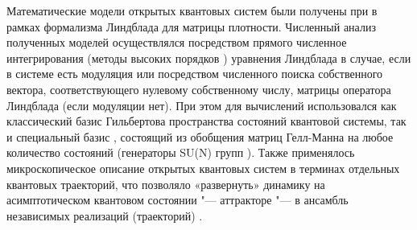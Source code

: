 {\methods} 
Математические модели открытых квантовых систем были получены при в рамках формализма Линдблада \autocite{Lindblad1976, Gorini1976, book2007} для матрицы плотности.
Численный анализ полученных моделей осуществлялся посредством прямого численное интегрирования (методы высоких порядков \autocite{Lambert1991}) уравнения Линдблада в случае, если в системе есть модуляция или посредством численного поиска собственного вектора, соответствующего нулевому собственному числу, матрицы оператора Линдблада (если модуляции нет). При этом для вычислений использовался как классический базис Гильбертова пространства состояний квантовой системы, так и специальный базис \cite{Liniov2019}, состоящий из обобщения матриц Гелл-Манна \autocite{GellMann1962} на любое количество состояний \autocite{Lendi1987} (генераторы SU(N) групп \autocite{Georgi2018}).
Также применялось микроскопическое описание открытых квантовых систем в терминах отдельных квантовых траекторий, что позволяло  «развернуть» динамику на асимптотическом квантовом состоянии "--- аттракторе "--- в ансамбль независимых реализаций (траекторий) \autocite{Dalibard1992, Dum1992, Plenio1998, Volokitin2017}.

